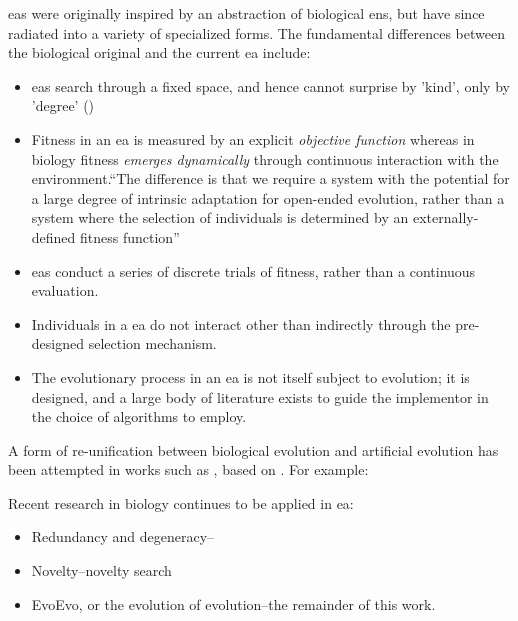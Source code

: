 \Glspl{ea} were originally inspired by an abstraction of biological \gls{ens}, but have since radiated into a variety of specialized forms. The fundamental differences between the biological original and the current \gls{ea} include:

\begin{itemize}
\item \Glspl{ea} search through a fixed space, and hence cannot surprise by 'kind', only by 'degree' (\eg \autocite{Nellis2014})
\item Fitness in an \gls{ea} is measured by an explicit \emph{objective function} whereas in biology fitness \emph{emerges dynamically} through continuous interaction with the environment.``The difference is that we require a system with the potential for a large degree of intrinsic adaptation for open-ended evolution, rather than a system where the selection of individuals is determined by an externally-defined fitness function'' \autocite{Taylor2001}
\item \Glspl{ea} conduct a series of discrete trials of fitness, rather than a continuous evaluation.
\item Individuals in a \gls{ea} do not interact other than indirectly through the pre-designed selection mechanism.
\item The evolutionary process in an \gls{ea} is not itself subject to evolution; it is designed, and a large body of literature exists to guide the implementor in the choice of algorithms to employ.
\end{itemize}

A form of re-unification between biological evolution and artificial evolution has been attempted in works such as \autocite{Paixao2015}, based on . For example: 

Recent research in biology continues to be applied in \gls{ea}:
\begin{itemize}
	\item Redundancy and degeneracy-- \eg \autocite{Whitacre:2010qy}
	\item Novelty--\eg novelty search \autocite{Lehman:2008cr}
	\item EvoEvo, or the evolution of evolution--\eg the remainder of this work.
\end{itemize}

